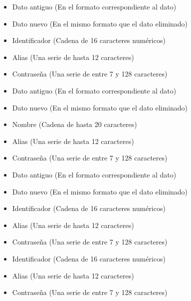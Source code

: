 \begin{itemize}
  \item Dato antiguo (En el formato correspondiente al dato)
  \item Dato nuevo (En el mismo formato que el dato eliminado)
  \item Identificador (Cadena de 16 caracteres numéricos)
  \item Alias (Una serie de hasta 12 caracteres)
  \item Contraseña (Una serie de entre 7 y 128 caracteres)
\end{itemize}

\begin{itemize}
  \item Dato antiguo (En el formato correspondiente al dato)
  \item Dato nuevo (En el mismo formato que el dato eliminado)
  \item Nombre (Cadena de hasta 20 caracteres)
  \item Alias (Una serie de hasta 12 caracteres)
  \item Contraseña (Una serie de entre 7 y 128 caracteres)
\end{itemize}


\begin{itemize}
  \item Dato antiguo (En el formato correspondiente al dato)
\item Dato nuevo (En el mismo formato que el dato eliminado)
\item Identificador (Cadena de 16 caracteres numéricos)
  \item Alias (Una serie de hasta 12 caracteres)
  \item Contraseña (Una serie de entre 7 y 128 caracteres)
\end{itemize}

\begin{itemize}
  \item Identificador (Cadena de 16 caracteres numéricos)
  \item Alias (Una serie de hasta 12 caracteres)
  \item Contraseña (Una serie de entre 7 y 128 caracteres)
\end{itemize}

